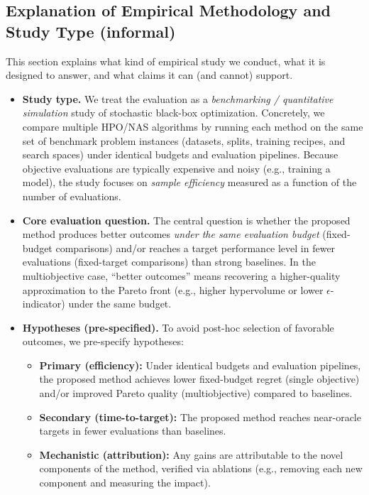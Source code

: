 \subsection*{Explanation of Empirical Methodology and Study Type (informal)}
This section explains what kind of empirical study we conduct, what it is designed to answer, and what claims it can (and cannot) support.

\begin{itemize}
    \item \textbf{Study type.}
    We treat the evaluation as a \emph{benchmarking / quantitative simulation} study of stochastic black-box optimization.
    Concretely, we compare multiple HPO/NAS algorithms by running each method on the same set of benchmark problem instances
    (datasets, splits, training recipes, and search spaces) under identical budgets and evaluation pipelines.
    Because objective evaluations are typically expensive and noisy (e.g., training a model), the study focuses on \emph{sample efficiency}
    measured as a function of the number of evaluations.

    \item \textbf{Core evaluation question.}
    The central question is whether the proposed method produces better outcomes \emph{under the same evaluation budget}
    (fixed-budget comparisons) and/or reaches a target performance level in fewer evaluations (fixed-target comparisons)
    than strong baselines.
    In the multiobjective case, ``better outcomes'' means recovering a higher-quality approximation to the Pareto front
    (e.g., higher hypervolume or lower \(\epsilon\)-indicator) under the same budget.

    \item \textbf{Hypotheses (pre-specified).}
    To avoid post-hoc selection of favorable outcomes, we pre-specify hypotheses:
    \begin{itemize}
        \item \textbf{Primary (efficiency):} Under identical budgets and evaluation pipelines, the proposed method achieves
        lower fixed-budget regret (single objective) and/or improved Pareto quality (multiobjective) compared to baselines.
        \item \textbf{Secondary (time-to-target):} The proposed method reaches near-oracle targets in fewer evaluations than baselines.
        \item \textbf{Mechanistic (attribution):} Any gains are attributable to the novel components of the method,
        verified via ablations (e.g., removing each new component and measuring the impact).
    \end{itemize}


\end{itemize}
